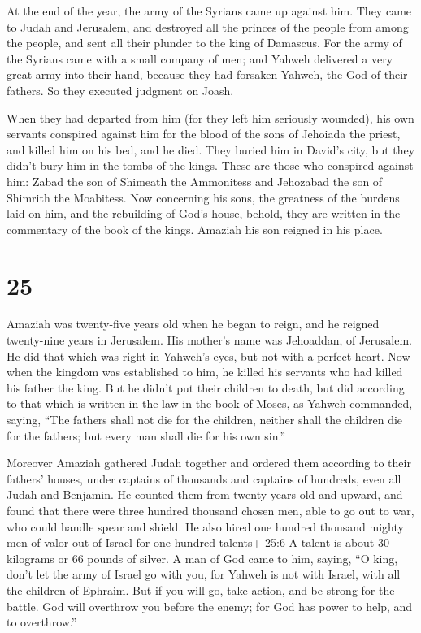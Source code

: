 At the end of the year, the army of the Syrians came up
against him. They came to Judah and Jerusalem, and destroyed all the
princes of the people from among the people, and sent all their plunder
to the king of Damascus.  For the army of the Syrians came
with a small company of men; and Yahweh delivered a very great army into
their hand, because they had forsaken Yahweh, the God of their fathers.
So they executed judgment on Joash.

 When they had departed from him (for they left him
seriously wounded), his own servants conspired against him for the blood
of the sons of Jehoiada the priest, and killed him on his bed, and he
died. They buried him in David's city, but they didn't bury him in the
tombs of the kings.  These are those who conspired against
him: Zabad the son of Shimeath the Ammonitess and Jehozabad the son of
Shimrith the Moabitess.  Now concerning his sons, the
greatness of the burdens laid on him, and the rebuilding of God's house,
behold, they are written in the commentary of the book of the kings.
Amaziah his son reigned in his place.

\hypertarget{section-24}{%
\section{25}\label{section-24}}

 Amaziah was twenty-five years old when he began to reign,
and he reigned twenty-nine years in Jerusalem. His mother's name was
Jehoaddan, of Jerusalem.  He did that which was right in
Yahweh's eyes, but not with a perfect heart.  Now when the
kingdom was established to him, he killed his servants who had killed
his father the king.  But he didn't put their children to
death, but did according to that which is written in the law in the book
of Moses, as Yahweh commanded, saying, ``The fathers shall not die for
the children, neither shall the children die for the fathers; but every
man shall die for his own sin.''

 Moreover Amaziah gathered Judah together and ordered them
according to their fathers' houses, under captains of thousands and
captains of hundreds, even all Judah and Benjamin. He counted them from
twenty years old and upward, and found that there were three hundred
thousand chosen men, able to go out to war, who could handle spear and
shield.  He also hired one hundred thousand mighty men of
valor out of Israel for one hundred talents+ 25:6 A talent is about 30
kilograms or 66 pounds of silver.  A man of God came to him,
saying, ``O king, don't let the army of Israel go with you, for Yahweh
is not with Israel, with all the children of Ephraim.  But
if you will go, take action, and be strong for the battle. God will
overthrow you before the enemy; for God has power to help, and to
overthrow.''

